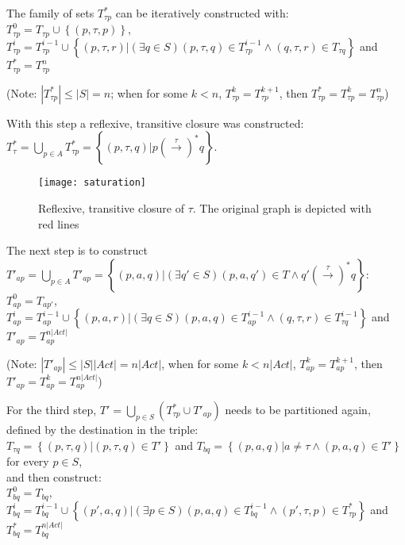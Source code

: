 The family of sets ${T^{*}_{\tau p}}$ can be iteratively constructed with:\\
${T^{0}_{\tau p}=T_{\tau p}\cup\left\{\left(p,\tau,p\right)\right\}}$,\\
${T^{i}_{\tau p}=T^{i-1}_{\tau p}\cup\left\{\left(p,\tau,r\right)|\left(\exists q\in S\right)\left(p,\tau,q\right)\in T^{i-1}_{\tau p}\wedge\left(q,\tau,r\right)\in T_{\tau q}\right\}}$ and \\
${T^{*}_{\tau p}=T^{n}_{\tau p}}$

(Note: ${\left|T^{*}_{\tau p}\right|\leq\left|S\right|=n}$; when for some ${k<n}$, ${T^{k}_{\tau p}=T^{k+1}_{\tau p}}$, then ${T^{*}_{\tau p}=T^{k}_{\tau p}=T^{n}_{\tau p}}$)

With this step a reflexive, transitive closure was constructed: ${T^{*}_{\tau}=\bigcup_{p\in A}T^{*}_{\tau p}=\left\{\left(p,\tau,q\right)|p\left(\stackrel{\tau}{\rightarrow}\right)^{*}q\right\}}$.

\begin{figure}[!ht]
\centering
\texttt{[image: saturation]}
\caption{Reflexive, transitive closure of $\tau$. The original graph is depicted with red lines}
\label{fig:saturation}
\end{figure}

The next step is to construct $T'_{ap}=\bigcup_{p\in A}T'_{ap}=\left\{\left(p,a,q\right)|\left(\exists q'\in S\right)\left(p,a,q'\right)\in T\wedge q'\left(\stackrel{\tau}{\rightarrow}\right)^{*}q\right\}$:\\
$T^{0}_{ap}=T_{ap'}$,\\
$T^{i}_{ap}=T^{i-1}_{ap}\cup \left\{\left(p,a,r\right)|\left(\exists q\in S\right)\left(p,a,q\right)\in T^{i-1}_{ap}\wedge \left(q,\tau,r\right)\in T^{i-1}_{\tau q}\right\}$ and \\
$T'_{ap}=T^{n|Act|}_{ap}$

(Note: $|T'_{ap}|\leq |S||Act|=n|Act|$, when for some $k<n|Act|$, $T^{k}_{ap}=T^{k+1}_{ap}$, then $T'_{ap}=T^{k}_{ap}=T^{n|Act|}_{ap}$)

For the third step, $T'=\bigcup_{p\in S}\left(T^{*}_{\tau p}\cup T'_{ap}\right)$ needs to be partitioned again, defined by the destination in the triple:\\
$T_{\tau q}=\left\{\left(p,\tau,q\right)|\left(p,\tau,q\right)\in T'\right\}$ and $T_{bq}=\left\{\left(p,a,q\right)|a\neq\tau\wedge\left(p,a,q\right)\in T'\right\}$ for every $p\in S$,\\
and then construct:\\
$T^{0}_{bq}=T_{bq}$,\\
$T^{i}_{bq}=T^{i-1}_{bq}\cup\left\{\left(p',a,q\right)|\left(\exists p\in S\right)\left(p,a,q\right)\in T^{i-1}_{bq}\wedge\left(p',\tau,p\right)\in T^{*}_{\tau p}\right\}$ and\\
$T^{*}_{bq}=T^{n|Act|}_{bq}$

